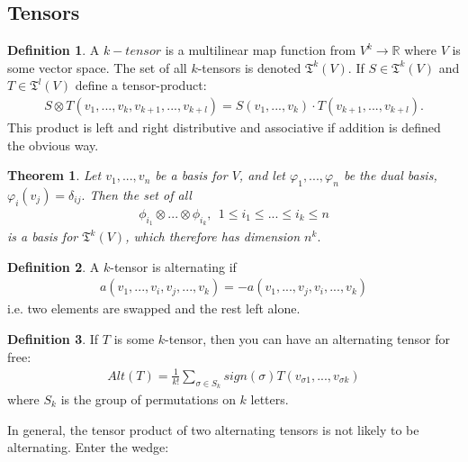 \documentclass[20pt]{article}
\theoremstyle{plain}
\newtheorem{theorem}{Theorem}
\theoremstyle{definition}
\newtheorem{definition}{Definition}
\newcommand{\reals}{\mathbb{R}}
\begin{document}
\subsection{Tensors}
\begin{definition}
  A $k-tensor$ is a multilinear map function from 
  $V^k \to \reals$ where $V$ is some vector space.
  The set of all $k$-tensors is denoted $\mathfrak{T}^k(V)$.
  If $S \in \mathfrak{T}^k(V)$ and $T \in \mathfrak{T}^l(V)$
  define a tensor-product:
  \begin{align*}
    S \otimes T (v_1, ..., v_k, v_{k+1}, ..., v_{k+l}) = 
    S(v_1, ..., v_k)\cdot T(v_{k+1}, ..., v_{k+l}).
  \end{align*}
  This product is left and right distributive and associative if addition is defined the obvious way.
\end{definition}

\begin{theorem}
  Let $v_1, ..., v_n$ be a basis for $V$, and let 
  $\varphi_1, ..., \varphi_n$ be the dual basis, $\varphi_i(v_j) = \delta_{ij}.$
  Then the set of all 
  \begin{align*}
    \phi_{i_1} \otimes ... \otimes \phi_{i_k}, \ \ 1 \leq i_1 \leq ... \leq i_k \leq n
  \end{align*}
  is a basis for $\mathfrak{T}^k(V)$, which therefore has dimension $n^k.$
\end{theorem}


\begin{definition}
  A $k$-tensor is alternating if
  \begin{align*}
    a(v_1, ..., v_i, v_j, ..., v_k) = -a(v_1, ..., v_j, v_i, ..., v_k)
  \end{align*}
  i.e. two elements are swapped and the rest left alone.
\end{definition}


\begin{definition}
  If $T$ is some $k$-tensor, 
  then you can have an alternating tensor for free:
  \begin{align*}
    Alt(T) = \frac{1}{k!}\sum_{\sigma \in S_k} sign(\sigma)
      T(v_{\sigma1}, ..., v_{\sigma k})
  \end{align*}
  where $S_k$ is the group of permutations on $k$ letters.
\end{definition}

In general, the tensor product of two alternating tensors is not likely to be alternating.  Enter the wedge:
\end{document}
